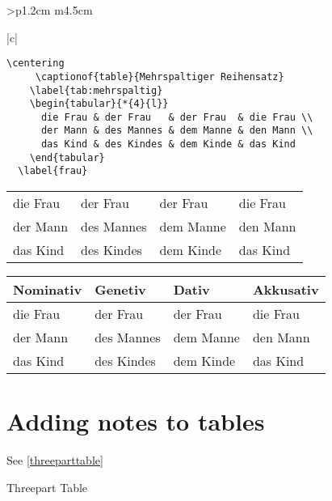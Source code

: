 \begin{tabular}{>{\bfseries}p{1.2cm} m{4.5cm}}
\begin{tabular}[t]{|c|}
\begin{longtable}
\begin{scriptexample}{}{}
\begin{verbatim}
\centering
     \captionof{table}{Mehrspaltiger Reihensatz}
    \label{tab:mehrspaltig}
    \begin{tabular}{*{4}{l}}
      die Frau & der Frau   & der Frau  & die Frau \\
      der Mann & des Mannes & dem Manne & den Mann \\
      das Kind & des Kindes & dem Kinde & das Kind
    \end{tabular}
  \label{frau}
\end{verbatim}
{    \centering
    \label{tab:mehrspaltig}
    \begin{tabular}{*{4}{l}}
      die Frau & der Frau   & der Frau  & die Frau \\
      der Mann & des Mannes & dem Manne & den Mann \\
      das Kind & des Kindes & dem Kinde & das Kind
    \end{tabular}
  \label{frau}
  
 }

\end{scriptexample}



{    \centering
    \label{tab:tabellensatz}
    \begin{tabular}{@{}*{4}{l}@{}}
      \toprule
        Nominativ & Genetiv & Dativ & Akkusativ \\
      \midrule
        die Frau & der Frau   & der Frau  & die Frau \\
        der Mann & des Mannes & dem Manne & den Mann \\
        das Kind & des Kindes & dem Kinde & das Kind \\
      \bottomrule
    \end{tabular}
} 

\section{Adding notes to tables}
See \ref{threeparttable}

\begin{texexample}{Threepart Table}{}
  {\begin{center}


\end{center}}
\end{texexample}
\end{longtable}
\end{tabular}
\end{tabular}
